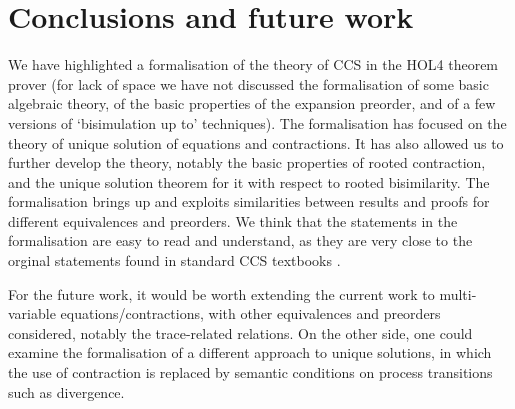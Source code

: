 


\section{Conclusions and future work}
\label{s:concl}

We have highlighted a formalisation of the theory of CCS in the 
HOL4 theorem prover (for lack of space we have not discussed 
the formalisation of some basic algebraic theory, of the basic
properties of the expansion preorder,   and of a few
 versions of `bisimulation up to'
techniques). %
The formalisation has focused on the theory of
unique solution of equations and contractions. 
It has also allowed us to further develop the theory,
notably the basic properties of rooted contraction, and the unique
solution theorem for it with respect to rooted bisimilarity. 
The formalisation brings up and exploits similarities between results
and proofs for different equivalences and preorders. 
We think that the statements in the formalisation are easy to read and
understand, as they are very close to the orginal statements found in
standard CCS textbooks \cite{Gorrieri:2015jt,Mil89}.

For the future work, it would be worth extending the current work
to multi-variable equations/contractions, with other equivalences
and preorders considered, notably the trace-related relations.
On the other side, one could examine the formalisation of a different approach to unique
solutions, in which the use of contraction is
replaced by semantic conditions on process transitions such as
divergence. \cite{DurierHS17}



